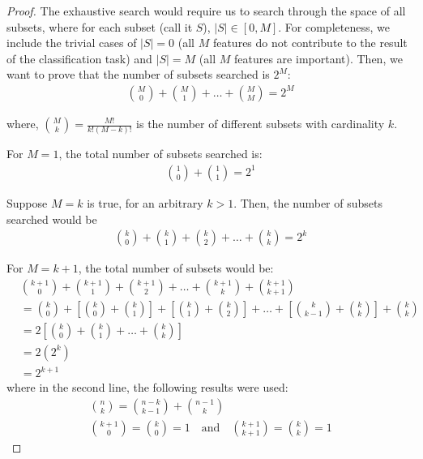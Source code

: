 \documentclass[12pt, twoside, a4paper]{report}
\begin{document}
\begin{proof}
The exhaustive search would require us to search through the space of all subsets, where for each subset (call it $S$), $|S| \in \left[ 0, M \right]$. For completeness, we include the trivial cases of $|S|=0$ (all $M$ features do not contribute to the result of the classification task) and $|S|=M$ (all $M$ features are important). Then, we want to prove that the number of subsets searched is $2^M$:
\begin{align*}
{{M}\choose{0}} + {{M}\choose{1}} + \dots + {{M}\choose{M}} = 2^M
\end{align*}

where, ${{M}\choose{k}} = \frac{M!}{k!(M-k)!}$ is the number of different subsets with cardinality $k$. 

For $M=1$, the total number of subsets searched is:
\begin{align*}
{{1}\choose{0}} + {{1}\choose{1}} = 2^1
\end{align*}

Suppose $M=k$ is true, for an arbitrary $k>1$. Then, the number of subsets searched would be
\begin{align*}
{{k}\choose{0}} + {{k}\choose{1}} + {{k}\choose{2}} + \dots + {{k}\choose{k}} = 2^k 
\end{align*}

For $M=k+1$, the total number of subsets would be:
\begin{align*}
&{{k+1}\choose{0}} + {{k+1}\choose{1}} + {{k+1}\choose{2}} + \dots + {{k+1}\choose{k}} + {{k+1}\choose{k+1}} \\
&= {{k}\choose{0}} + \left[ {{k}\choose{0}} + {{k}\choose{1}} \right] + \left[ {{k}\choose{1}} + {{k}\choose{2}} \right] + \dots + \left[ {{k}\choose{k-1}} + {{k}\choose{k}} \right] + {{k}\choose{k}} \\
&= 2 \left[ {{k}\choose{0}} + {{k}\choose{1}} + \dots + {{k}\choose{k}} \right] \\
&= 2 \left(2^k \right) \\
&= 2^{k+1}
\end{align*}
where in the second line, the following results were used:
\begin{gather*}
{{n}\choose{k}} = {{n-k}\choose{k-1}} + {{n-1}\choose{k}} \\
{{k+1}\choose{0}} = {{k}\choose{0}} = 1 \quad \text{and} \quad {{k+1}\choose{k+1}} = {{k}\choose{k}} = 1
\end{gather*}
\end{proof}
\end{document}
